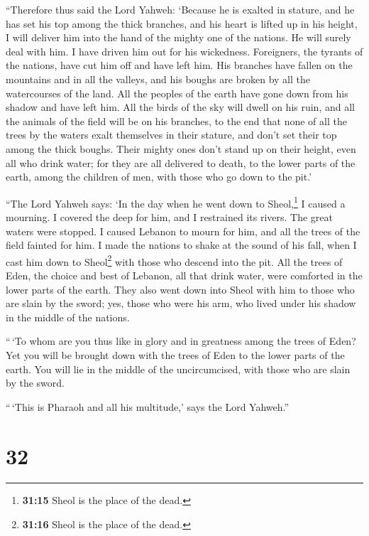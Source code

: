  ``Therefore thus said the Lord Yahweh: `Because he is
exalted in stature, and he has set his top among the thick branches, and
his heart is lifted up in his height,  I will deliver him
into the hand of the mighty one of the nations. He will surely deal with
him. I have driven him out for his wickedness. 
Foreigners, the tyrants of the nations, have cut him off and have left
him. His branches have fallen on the mountains and in all the valleys,
and his boughs are broken by all the watercourses of the land. All the
peoples of the earth have gone down from his shadow and have left him.
 All the birds of the sky will dwell on his ruin, and all
the animals of the field will be on his branches,  to the
end that none of all the trees by the waters exalt themselves in their
stature, and don't set their top among the thick boughs. Their mighty
ones don't stand up on their height, even all who drink water; for they
are all delivered to death, to the lower parts of the earth, among the
children of men, with those who go down to the pit.'

 ``The Lord Yahweh says: `In the day when he went down to
Sheol,\footnote{\textbf{31:15} Sheol is the place of the dead.} I caused
a mourning. I covered the deep for him, and I restrained its rivers. The
great waters were stopped. I caused Lebanon to mourn for him, and all
the trees of the field fainted for him.  I made the
nations to shake at the sound of his fall, when I cast him down to
Sheol\footnote{\textbf{31:16} Sheol is the place of the dead.} with
those who descend into the pit. All the trees of Eden, the choice and
best of Lebanon, all that drink water, were comforted in the lower parts
of the earth.  They also went down into Sheol with him to
those who are slain by the sword; yes, those who were his arm, who lived
under his shadow in the middle of the nations.

 ``\,`To whom are you thus like in glory and in greatness
among the trees of Eden? Yet you will be brought down with the trees of
Eden to the lower parts of the earth. You will lie in the middle of the
uncircumcised, with those who are slain by the sword.

``\,`This is Pharaoh and all his multitude,' says the Lord Yahweh.''

\hypertarget{section-31}{%
\section{32}\label{section-31}}

